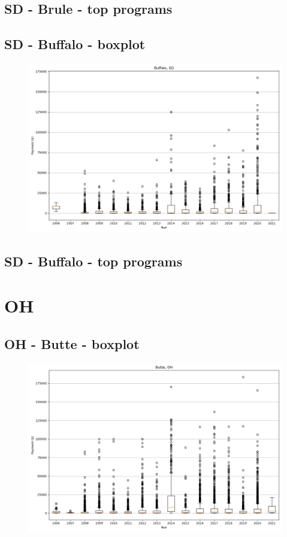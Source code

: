 \subsection*{SD - Brule - top programs}

\newpage
\subsection*{SD - Buffalo - boxplot}
\begin{figure}[h]
\centering
\includegraphics[width=7in]{../output/boxplots/counties/Buffalo-SD_boxplot.png}
\end{figure}


\subsection*{SD - Buffalo - top programs}

\newpage
\section*{OH}
\subsection*{OH - Butte - boxplot}
\begin{figure}[h]
\centering
\includegraphics[width=7in]{../output/boxplots/counties/Butte-OH_boxplot.png}
\end{figure}


